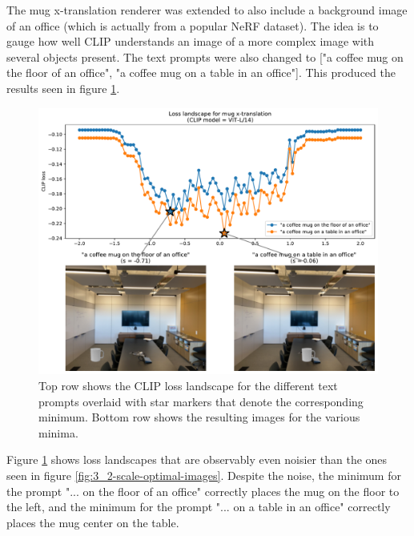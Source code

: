 The mug x-translation renderer was extended to also include a background image of an office (which is actually from a popular NeRF dataset). The idea is to gauge how well CLIP understands an image of a more complex image with several objects present. The text prompts were also changed to ["a coffee mug on the floor of an office", "a coffee mug on a table in an office"]. This produced the results seen in figure \ref{fig:3_2-room-translation-optimal-images}.
\begin{figure}[H]
    \centering
    \includegraphics[width=1.0\textwidth]{figures/3_2-room-translation-optimal-images.pdf}
    \caption{Top row shows the CLIP loss landscape for the different text prompts overlaid with star markers that denote the corresponding minimum. Bottom row shows the resulting images for the various minima.}
    \label{fig:3_2-room-translation-optimal-images}
\end{figure}
Figure \ref{fig:3_2-room-translation-optimal-images} shows loss landscapes that are observably even noisier than the ones seen in figure \ref{fig:3_2-scale-optimal-images}. Despite the noise, the  minimum for the prompt "... on the floor of an office" correctly places the mug on the floor to the left, and the minimum for the prompt "... on a table in an office" correctly places the mug center on the table.

